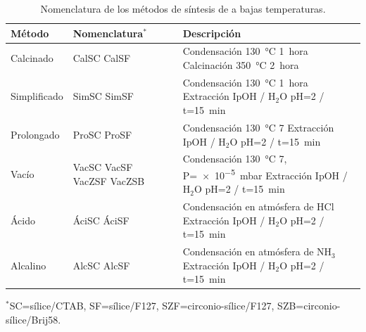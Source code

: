 		 	\begin{table}[b!] 
		 	 \caption[Tratamientos alternativos de síntesis de \pdm]{Nomenclatura de los métodos de síntesis de \pdm\space a bajas temperaturas.}
			 \begin{tabular}{>{\raggedright\arraybackslash}m{1.9cm}>{\centering\arraybackslash}m{1cm}>{\raggedright\arraybackslash}m{0.9cm}>{\raggedright\arraybackslash}m{6.62cm}} 
			 \toprule
				 Método   &  Nomenclatura$^*$&  & Descripción \\ \midrule
				 Calcinado & CalSC CalSF& &  Condensación\index{condensación} \SI{130}{\celsius} \SI{1}{hora}\hspace{2cm} Calcinación \SI{350}{\celsius} \SI{2}{hora}\hspace{2cm} \\ \midrule
				 Simplificado & SimSC SimSF& &  Condensación\index{condensación} \SI{130}{\celsius} \SI{1}{hora}\hspace{2cm} Extracción IpOH / H$_2$O pH\index{pH}=2 / t=\SI{15}{min}\\ \midrule
				 Prolongado & ProSC ProSF& & Condensación\index{condensación} \SI{130}{\celsius} \SI{7}{\text{días}}\hspace{2cm} Extracción IpOH / H$_2$O pH\index{pH}=2 / t=\SI{15}{min} \\ \midrule				
				 Vacío & VacSC VacSF VacZSF VacZSB& &  Condensación\index{condensación} \SI{130}{\celsius} \SI{7}{\text{días}}, P=\SI{e-5}{\milli\bar}\hspace{2cm} Extracción IpOH / H$_2$O pH\index{pH}=2 / t=\SI{15}{min}\\ \midrule
				 Ácido & ÁciSC ÁciSF& &  Condensación\index{condensación} en atmósfera\index{atmósfera} de HCl\index{acido@ácido!clohídrico}\hspace{2cm} Extracción IpOH / H$_2$O pH\index{pH}=2 / t=\SI{15}{min}\\ \midrule
				 Alcalino & AlcSC AlcSF& & Condensación\index{condensación} en atmósfera\index{atmósfera} de NH\index{amoniaco}$_3$\hspace{2cm} Extracción IpOH / H$_2$O pH\index{pH}=2 / t=\SI{15}{min}\\ 
				\bottomrule
				   \end{tabular}\vspace*{2pt}
		    	  	\footnotesize{$^*$SC=sílice/CTAB, SF=sílice/F127, SZF=circonio-sílice/F127, SZB=circonio-sílice/Brij58.}
				   	\label{tabla:tratamientos}
				   \end{table}

